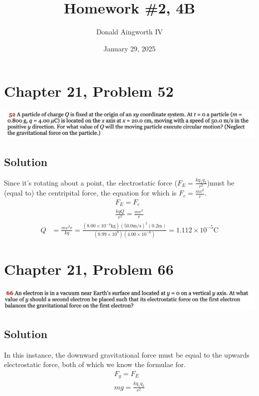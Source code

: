 \documentclass[12pt]{article}
\title{Homework \#2, 4B}
\author{Donald Aingworth IV}
\date{January 29, 2025}
\begin{document}

\maketitle

\pagebreak
\section*{Chapter 21, Problem 52}
\includegraphics[width=\textwidth]{picture_1.png}

\subsection*{Solution}
Since it's rotating about a point, the electrostatic force ($F_E = \frac{kq_1 q_2}{r^2}$)must be (equal to) the centripital force, the equation for which is $F_c = \frac{mv^2}{r}$.
\begin{gather*}
    F_E = F_c\\
    \frac{kqQ}{r^2} = \frac{mv^2}{r}
\end{gather*}
\begin{align*}
    Q   &=  \frac{mv^2r}{kq}
        =   \frac{(8.00 \times 10^{-4} \unit{\kilo\gram})(50.0\unit{\meter/\second})^2(0.2\unit{\meter})}{(8.99 \times 10^{9})(4.00 \times 10^{-6})}
        =   \boxed{1.112 \times 10^{-5} \unit{\coulomb}}
\end{align*}

\pagebreak
\section*{Chapter 21, Problem 66}
\includegraphics[width=\textwidth]{picture_2.png}

\subsection*{Solution}
In this instance, the downward gravitational force must be equal to the upwards electrostatic force, both of which we know the formulae for.
\begin{gather*}
    F_g = F_E\\
    mg = \frac{kq_1 q_2}{r^2}
\end{gather*}
\end{document}
